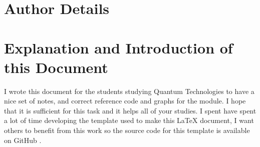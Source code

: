 \documentclass[colorlinks,11pt,a4paper,normalphoto,withhyper,ragged2e]{altareport}
\begin{document}
	
	\MakeReportTitlePage
	
	
	\setcounter{page}{1}
	
	
	
	
	\section*{Author Details}
	
		\makeauthordetails
		
		
		
		\setcounter{tocdepth}{2} 
		\tableofcontents %
	
	
	
	
	\fontsize{11pt}{12pt}\selectfont %
	
	\abovedisplayskip=0pt
	\abovedisplayshortskip=2pt
	\belowdisplayskip=12pt
	\belowdisplayshortskip=12pt
	
	
	
	
	
	\section*{Explanation and Introduction of this Document}
		
		I wrote this document for the students studying Quantum Technologies to have a nice set of notes, and correct reference code and graphs for the module. I hope that it is sufficient for this task and it helps all of your studies. \linebreak
		I spent have spent a lot of time developing the template used to make this {\LaTeX} document, I want others to benefit from this work so the source code for this template is available on GitHub \cite{latex_template_github}.
		
\end{document}
